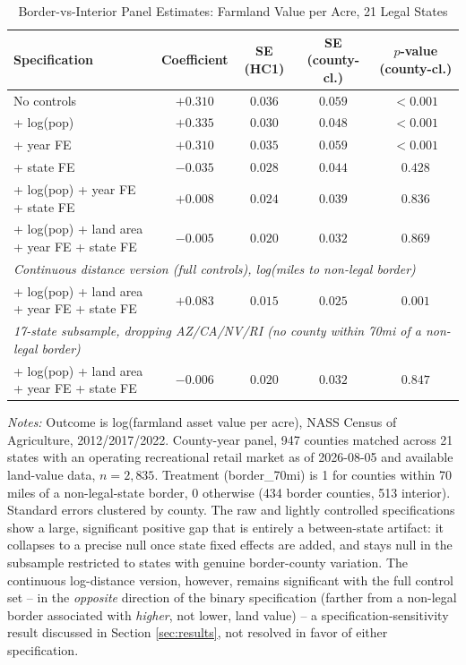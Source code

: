 \begin{table}[htbp]
\centering
\caption{Border-vs-Interior Panel Estimates: Farmland Value per Acre, 21 Legal States}
\label{tab:landvalue_border_panel}
\begin{tabular}{lcccc}
\toprule
Specification & Coefficient & SE (HC1) & SE (county-cl.) & $p$-value (county-cl.) \\
\midrule
No controls & $+0.310$ & $0.036$ & $0.059$ & $<0.001$ \\
+ log(pop) & $+0.335$ & $0.030$ & $0.048$ & $<0.001$ \\
+ year FE & $+0.310$ & $0.035$ & $0.059$ & $<0.001$ \\
+ state FE & $-0.035$ & $0.028$ & $0.044$ & $0.428$ \\
+ log(pop) + year FE + state FE & $+0.008$ & $0.024$ & $0.039$ & $0.836$ \\
+ log(pop) + land area + year FE + state FE & $-0.005$ & $0.020$ & $0.032$ & $0.869$ \\
\midrule
\multicolumn{5}{l}{\textit{Continuous distance version (full controls), log(miles to non-legal border)}} \\
+ log(pop) + land area + year FE + state FE & $+0.083$ & $0.015$ & $0.025$ & $0.001$ \\
\midrule
\multicolumn{5}{l}{\textit{17-state subsample, dropping AZ/CA/NV/RI (no county within 70mi of a non-legal border)}} \\
+ log(pop) + land area + year FE + state FE & $-0.006$ & $0.020$ & $0.032$ & $0.847$ \\
\bottomrule
\end{tabular}
\begin{minipage}{0.95\textwidth}
\vspace{0.3em}
\footnotesize
\textit{Notes:} Outcome is log(farmland asset value per acre), NASS Census of Agriculture, 2012/2017/2022.
County-year panel, 947 counties matched across 21 states with an operating recreational retail market as
of 2026-08-05 and available land-value data, $n=2{,}835$. Treatment (border\_70mi) is 1 for counties
within 70 miles of a non-legal-state border, 0 otherwise (434 border counties, 513 interior). Standard
errors clustered by county. The raw and lightly controlled specifications show a large, significant
positive gap that is entirely a between-state artifact: it collapses to a precise null once state fixed
effects are added, and stays null in the subsample restricted to states with genuine border-county
variation. The continuous log-distance version, however, remains significant with the full control set --
in the \emph{opposite} direction of the binary specification (farther from a non-legal border associated
with \emph{higher}, not lower, land value) -- a specification-sensitivity result discussed in Section
\ref{sec:results}, not resolved in favor of either specification.
\end{minipage}
\end{table}
